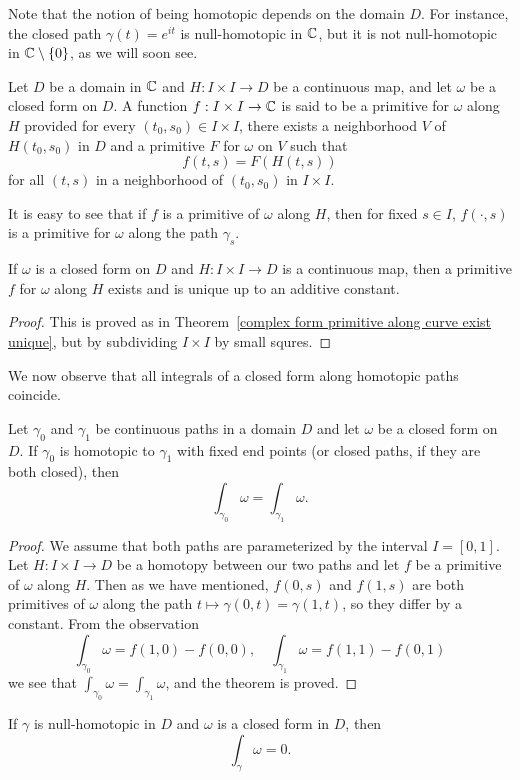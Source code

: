 Note that the notion of being homotopic depends on the domain $D$. For instance, the closed path $\gamma(t)=e^{it}$ is null-homotopic in $\mathbb{C}$, but it is not null-homotopic in $\mathbb{C}\setminus\{0\}$, as we will soon see.
\begin{definition}
Let $D$ be a domain in $\mathbb{C}$ and $H:I\times I\to D$ be a continuous map, and
let $\omega$ be a closed form on $D$. A function $f:I\times I\to\mathbb{C}$ is said to be a primitive for $\omega$ along $H$ provided for every $(t_0,s_0)\in I\times I$, there exists a neighborhood $V$ of $H(t_0,s_0)$ in $D$ and a
primitive $F$ for $\omega$ on $V$ such that
\[f(t,s)=F(H(t,s))\]
for all $(t,s)$ in a neighborhood of $(t_0,s_0)$ in $I\times I$.
\end{definition}
It is easy to see that if $f$ is a primitive of $\omega$ along $H$, then for fixed $s\in I$, $f(\cdot,s)$ is a primitive for $\omega$ along the path $\gamma_s$.
\begin{theorem}
If $\omega$ is a closed form on $D$ and $H:I\times I\to D$ is a continuous map, then a primitive $f$ for $\omega$ along $H$ exists and is unique up to an additive constant.
\end{theorem}
\begin{proof}
This is proved as in Theorem~\ref{complex form primitive along curve exist unique}, but by subdividing $I\times I$ by small squres.
\end{proof}
We now observe that all integrals of a closed form along homotopic paths coincide.
\begin{theorem}\label{complex form integral homotopy}
Let $\gamma_0$ and $\gamma_1$ be continuous paths in a domain $D$ and let $\omega$ be a closed form on $D$. If $\gamma_0$ is homotopic to $\gamma_1$ with fixed end points (or closed paths, if they are both closed), then
\[\int_{\gamma_0}\omega=\int_{\gamma_1}\omega.\]
\end{theorem}
\begin{proof}
We assume that both paths are parameterized by the interval $I=[0,1]$. Let $H:I\times I\to D$ be a homotopy between our two paths and let $f$ be a primitive of $\omega$ along $H$. Then as we have mentioned, $f(0,s)$ and $f(1,s)$ are both primitives of $\omega$ along the path $t\mapsto\gamma(0,t)=\gamma(1,t)$, so they differ by a constant. From the observation
\[\int_{\gamma_0}\omega=f(1,0)-f(0,0),\quad\int_{\gamma_1}\omega=f(1,1)-f(0,1)\]
we see that $\int_{\gamma_0}\omega=\int_{\gamma_1}\omega$, and the theorem is proved.
\end{proof}
\begin{corollary}
If $\gamma$ is null-homotopic in $D$ and $\omega$ is a closed form in $D$, then
\[\int_{\gamma}\omega=0.\]
\end{corollary}
